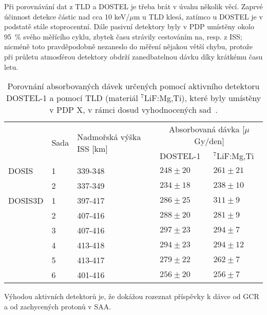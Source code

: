 Při porovnávání dat z TLD a DOSTEL je třeba brát v úvahu několik věcí. Zaprvé účinnost detekce částic nad cca 10 keV/$\mu$m u TLD klesá, zatímco u DOSTEL je v podstatě stále stoprocentní. Dále pasivní detektory byly v PDP umístěny okolo 95~\% svého měřícího cyklu, zbytek času strávily cestováním na, resp. z ISS; nicméně toto pravděpodobně nezaneslo do měření nějakou větší chybu, protože při průletu atmosférou detektory obdrží zanedbatelnou dávku díky krátkému času letu.
\begin{table}[H]
  \centering
  \def\arraystretch{1}
  \footnotesize
  \caption{Porovnání absorbovaných dávek určených pomocí aktivního detektoru DOSTEL-1 a pomocí TLD (materiál $^7$LiF:Mg,Ti), které byly umístěny v PDP X, v rámci dosud vyhodnocených sad~\cite{dosis}.}
  \label{tab:dosis_vysl_srovnaniPassiveActive}
  \begin{tabular}{lll|ll}
	\toprule
	&\multirow{2}{*}{Sada}&\multirow{2}{*}{Nadmořská výška ISS [km]}&\multicolumn{2}{c}{Absorbovaná dávka [$\mu$Gy/den]}\\
	 & & &DOSTEL-1&$^7$LiF:Mg,Ti\\
	\midrule
	DOSIS	&1&339-348&$248\pm20$&$261\pm21$\\ 
			&2&337-349&$234\pm18$&$238\pm10$\\
	DOSIS3D	&1&397-417&$286\pm25$&$311\pm9 $\\
			&2&407-416&$288\pm20$&$281\pm9 $\\
			&3&407-416&$297\pm23$&$294\pm7 $\\
			&4&413-418&$294\pm23$&$294\pm12$\\
			&5&413-417&$279\pm22$&$262\pm7 $\\
			&6&401-416&$256\pm20$&$256\pm7 $\\
	\bottomrule
  \end{tabular}
\end{table}

Výhodou aktivních detektorů je, že dokážou rozeznat příspěvky k dávce od GCR a od zachycených protonů v SAA.
